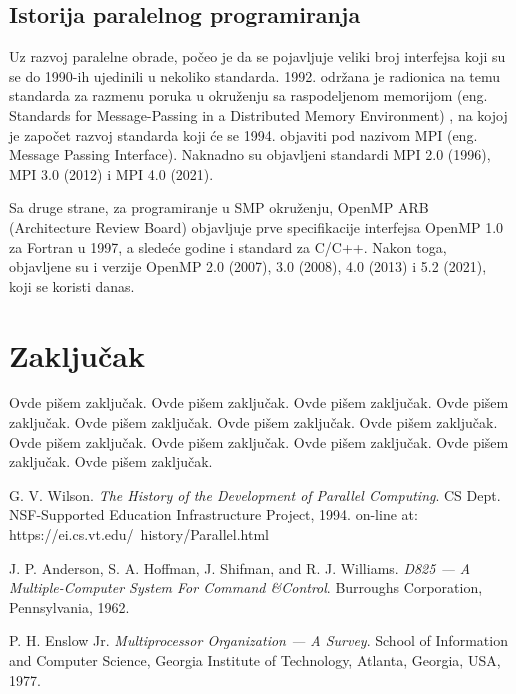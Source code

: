 \documentclass[a4paper]{article}
\begin{document}
{	\subsection{Istorija paralelnog programiranja}
	Uz razvoj paralelne obrade, počeo je da se pojavljuje veliki broj interfejsa koji su se do 1990-ih ujedinili u nekoliko standarda. 1992. održana je radionica na temu standarda za razmenu poruka u okruženju sa raspodeljenom memorijom (eng. Standards for Message-Passing in a Distributed Memory Environment) \cite{standardsformessagepassing}, na kojoj je započet razvoj standarda koji će se 1994. objaviti pod nazivom MPI (eng. Message Passing Interface). Naknadno su objavljeni standardi MPI 2.0 (1996), MPI 3.0 (2012) i MPI 4.0 (2021)\cite{mpidocs}.\par
	Sa druge strane, za programiranje u SMP okruženju, OpenMP ARB (Architecture Review Board) objavljuje prve specifikacije interfejsa OpenMP 1.0 za Fortran u 1997, a sledeće godine i standard za C/C++. Nakon toga, objavljene su i verzije OpenMP 2.0 (2007), 3.0 (2008), 4.0 (2013) i 5.2 (2021), koji se koristi danas\cite{opemp5}.
	
	\section{Zaključak}
	\label{sec:zakljucak}
	Ovde pišem zaključak. 
	Ovde pišem zaključak. 
	Ovde pišem zaključak. 
	Ovde pišem zaključak. 
	Ovde pišem zaključak. 
	Ovde pišem zaključak. 
	Ovde pišem zaključak. 
	Ovde pišem zaključak. 
	Ovde pišem zaključak. 
	Ovde pišem zaključak. 
	Ovde pišem zaključak. 
	Ovde pišem zaključak. 
	
	\appendix
	
	\iffalse
	 
	
	\fi
	
	\begin{thebibliography}{50}
		
		 G. V. Wilson. \emph{The History of the Development of Parallel Computing}. CS Dept. NSF-Supported Education Infrastructure Project, 1994. on-line at: https://ei.cs.vt.edu/~history/Parallel.html
		
		 J. P. Anderson, S. A. Hoffman, J. Shifman, and R. J. Williams. \emph{D825 — A Multiple-Computer System For Command \&Control}. Burroughs Corporation, Pennsylvania, 1962.
		
		 P. H. Enslow Jr. \emph{Multiprocessor Organization — A Survey}. School of Information and Computer Science, Georgia Institute of Technology, Atlanta, Georgia, USA, 1977.
		

\end{thebibliography}}
\end{document}
